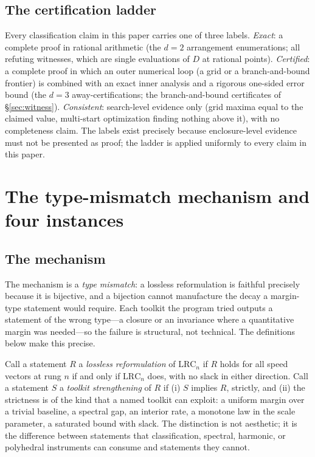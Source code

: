 \documentclass[11pt,a4paper]{article}
\numberwithin{equation}{section}
\theoremstyle{plain}
\theoremstyle{definition}
\theoremstyle{remark}
\newcommand{\lrc}{\mathrm{LRC}}
\begin{document}
\subsection{The certification ladder}

Every classification claim in this paper carries one of three labels.
\emph{Exact}: a complete proof in rational arithmetic (the $d=2$
arrangement enumerations; all refuting witnesses, which are single
evaluations of $D$ at rational points). \emph{Certified}: a complete
proof in which an outer numerical loop (a grid or a branch-and-bound
frontier) is combined with an exact inner analysis and a rigorous
one-sided error bound (the $d=3$ away-certifications; the
branch-and-bound certificates of \S\ref{sec:witness}). \emph{Consistent}:
search-level evidence only (grid maxima equal to the claimed value,
multi-start optimization finding nothing above it), with no completeness
claim. The labels exist precisely because enclosure-level evidence must
not be presented as proof; the ladder is applied uniformly to every
claim in this paper.


\section{The type-mismatch mechanism and four instances}\label{sec:tm}

\subsection{The mechanism}\label{sec:tm-mech}

The mechanism is a \emph{type mismatch}: a lossless reformulation is
faithful precisely because it is bijective, and a bijection cannot
manufacture the decay a margin-type statement would require. Each
toolkit the program tried outputs a statement of the wrong type---a
closure or an invariance where a quantitative margin was needed---so the
failure is structural, not technical. The definitions below make this
precise.

Call a statement $R$ a \emph{lossless reformulation} of $\lrc_n$ if $R$
holds for all speed vectors at rung $n$ if and only if $\lrc_n$ does, with
no slack in either direction. Call a statement $S$ a \emph{toolkit
strengthening} of $R$ if (i) $S$ implies $R$, strictly, and (ii) the
strictness is of the kind that a named toolkit can exploit: a uniform
margin over a trivial baseline, a spectral gap, an interior rate, a
monotone law in the scale parameter, a saturated bound with slack. The
distinction is not aesthetic; it is the difference between statements
that classification, spectral, harmonic, or polyhedral instruments can
consume and statements they cannot.
\end{document}
